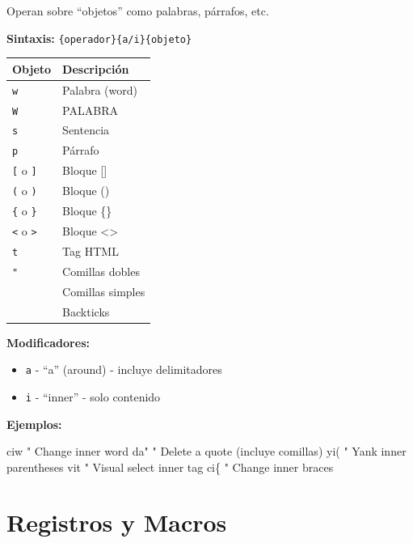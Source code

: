 \documentclass[
  doc,
  floatsintext,
  longtable,
  a4paper,
  nolmodern,
  notxfonts,
  notimes,
  12pt,
  colorlinks=true,linkcolor=blue,citecolor=blue,urlcolor=blue]{apa7}
\newenvironment{Shaded}{\begin{snugshade}}{\end{snugshade}}
\newcommand{\NormalTok}[1]{\textcolor[rgb]{0.00,0.23,0.31}{#1}}
\providecommand{\tightlist}{%
  \setlength{\itemsep}{0pt}\setlength{\parskip}{0pt}}
\newcounter{none} %
\begin{document}
Operan sobre ``objetos'' como palabras, párrafos, etc.

\textbf{Sintaxis:} \texttt{\{operador\}\{a/i\}\{objeto\}}

{\def\LTcaptype{none} %
\begin{longtable}[]{@{}ll@{}}
\toprule\noalign{}
Objeto & Descripción \\
\midrule\noalign{}
\endhead
\bottomrule\noalign{}
\endlastfoot
\texttt{w} & Palabra (word) \\
\texttt{W} & PALABRA \\
\texttt{s} & Sentencia \\
\texttt{p} & Párrafo \\
\texttt{{[}} o \texttt{{]}} & Bloque {[}{]} \\
\texttt{(} o \texttt{)} & Bloque () \\
\texttt{\{} o \texttt{\}} & Bloque \{\} \\
\texttt{\textless{}} o \texttt{\textgreater{}} & Bloque
\textless\textgreater{} \\
\texttt{t} & Tag HTML \\
\texttt{"} & Comillas dobles \\
\texttt{\textquotesingle{}} & Comillas simples \\
\texttt{\textasciigrave{}} & Backticks \\
\end{longtable}
}

\textbf{Modificadores:}

\begin{itemize}
\tightlist
\item
  \texttt{a} - ``a'' (around) - incluye delimitadores
\item
  \texttt{i} - ``inner'' - solo contenido
\end{itemize}

\textbf{Ejemplos:}

\begin{Shaded}
\begin{Highlighting}[]
\NormalTok{ciw    " Change inner word}
\NormalTok{da"    " Delete a quote (incluye comillas)}
\NormalTok{yi(    " Yank inner parentheses}
\NormalTok{vit    " Visual select inner tag}
\NormalTok{ci\{    " Change inner braces}
\end{Highlighting}
\end{Shaded}

\section{Registros y Macros}\label{registros-y-macros}
\end{document}
